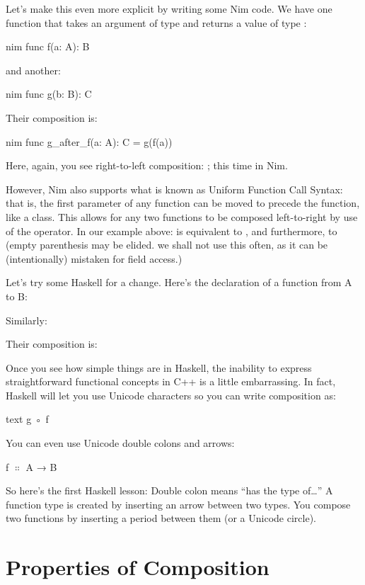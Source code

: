 Let's make this even more explicit by writing some Nim code. We have one
function  that takes an argument of type  and
returns a value of type :

\begin{snip}{nim}
func f(a: A): B
\end{snip}
and another:

\begin{snip}{nim}
func g(b: B): C
\end{snip}
Their composition is:

\begin{snip}{nim}
func g_after_f(a: A): C = g(f(a))
\end{snip}
Here, again, you see right-to-left composition: ; this
time in Nim.

However, Nim also supports what is known as Uniform Function Call Syntax:
that is, the first parameter of any function can be moved to precede the
function, like a class. This allows for any two functions to be composed
left-to-right by use of the  operator. In our example above:
 is equivalent to , and furthermore, to
 (empty parenthesis may be elided. we shall not use this often,
as it can be (intentionally) mistaken for field access.)

Let's try some Haskell for a change.
Here's the declaration of a function from A to B:

Similarly:

Their composition is:

Once you see how simple things are in Haskell, the inability to express
straightforward functional concepts in C++ is a little embarrassing. In
fact, Haskell will let you use Unicode characters so you can write
composition as:
\begin{snip}{text}
g ◦ f
\end{snip}

You can even use Unicode double colons and arrows:
\begin{snipv}
f \ensuremath{\Colon} A → B
\end{snipv}
So here's the first Haskell lesson: Double colon means ``has the type
of\ldots{}'' A function type is created by inserting an arrow between
two types. You compose two functions by inserting a period between them
(or a Unicode circle).

\section{Properties of Composition}

